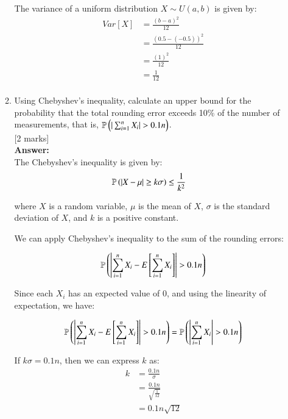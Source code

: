 \documentclass[12pt]{article}
\begin{document}
\begin{enumerate}
\begin{enumerate}
The variance of a uniform distribution $X \sim U(a, b)$ is given by:
\begin{align*}
Var[X] &= \frac{(b - a)^2}{12} \\
&= \frac{(0.5 - (-0.5))^2}{12} \\
&= \frac{(1)^2}{12} \\
&= \frac{1}{12} \\
\end{align*}
%

\item Using Chebyshev's inequality, calculate an upper bound for the probability that the total rounding error exceeds 10\% of the number of measurements, that is, ${\mathbb P}\left(|\sum_{i=1}^n X_i| > 0.1 n\right)$. 
			\\\phantom{1}\hfill [2 marks]
%
\\
\textbf{Answer:}
\\
The Chebyshev's inequality is given by:
\begin{align*}
{\mathbb P}\left(|X - \mu| \geq k\sigma\right) &\leq \frac{1}{k^2}
\end{align*}

where $X$ is a random variable, $\mu$ is the mean of $X$, $\sigma$ is the standard deviation of $X$, and $k$ is a positive constant.

We can apply Chebyshev's inequality to the sum of the rounding errors:

\begin{align*}
{\mathbb P}\left(\left|\sum_{i=1}^n X_i - E\left[\sum_{i=1}^n X_i\right]\right| > 0.1 n\right) \\
\end{align*}

Since each $X_i$ has an expected value of $0$, and using the linearity of expectation, we have:

\begin{align*}
{\mathbb P}\left(\left|\sum_{i=1}^n X_i - E\left[\sum_{i=1}^n X_i\right]\right| > 0.1 n\right) &= {\mathbb P}\left(\left|\sum_{i=1}^n X_i\right| > 0.1 n\right) \\
\end{align*}

If $k\sigma = 0.1 n$, then we can express $k$ as:
\begin{align*}
k &= \frac{0.1 n}{\sigma} \\
&= \frac{0.1 n}{\sqrt{\frac{1}{12}}} \\
&= 0.1 n \sqrt{12} \\
\end{align*}


\end{enumerate}
\end{enumerate}
\end{document}
